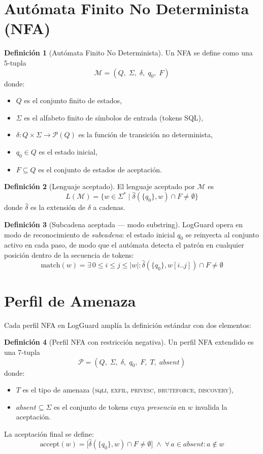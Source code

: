 \documentclass[12pt, a4paper]{report}
\theoremstyle{definition}
\newtheorem{definicion}{Definición}[chapter]
\theoremstyle{remark}
\newcommand{\nfa}[1]{\ensuremath{\mathcal{#1}}}
\begin{document}
\section{Autómata Finito No Determinista (NFA)}

\begin{definicion}[Autómata Finito No Determinista]
Un NFA se define como una 5-tupla
\[
  \nfa{M} = (Q,\; \Sigma,\; \delta,\; q_0,\; F)
\]
donde:
\begin{itemize}
  \item $Q$ es el conjunto finito de estados,
  \item $\Sigma$ es el alfabeto finito de símbolos de entrada (tokens SQL),
  \item $\delta : Q \times \Sigma \to \mathcal{P}(Q)$ es la función de
        transición no determinista,
  \item $q_0 \in Q$ es el estado inicial,
  \item $F \subseteq Q$ es el conjunto de estados de aceptación.
\end{itemize}
\end{definicion}

\begin{definicion}[Lenguaje aceptado]
El lenguaje aceptado por $\nfa{M}$ es
\[
  L(\nfa{M}) = \{ w \in \Sigma^* \mid \hat\delta(\{q_0\}, w) \cap F \neq \emptyset \}
\]
donde $\hat\delta$ es la extensión de $\delta$ a cadenas.
\end{definicion}

\begin{definicion}[Subcadena aceptada — modo substring]
LogGuard opera en modo de reconocimiento de \emph{subcadena}: el estado inicial
$q_0$ se reinyecta al conjunto activo en cada paso, de modo que el autómata
detecta el patrón en cualquier posición dentro de la secuencia de tokens:
\[
  \text{match}(w) = \exists\, 0 \le i \le j \le |w| : \hat\delta(\{q_0\}, w[i..j]) \cap F \neq \emptyset
\]
\end{definicion}

\section{Perfil de Amenaza}

Cada perfil NFA en LogGuard amplía la definición estándar con dos elementos:

\begin{definicion}[Perfil NFA con restricción negativa]
Un perfil NFA extendido es una 7-tupla
\[
  \nfa{P} = (Q,\; \Sigma,\; \delta,\; q_0,\; F,\; T,\; \mathit{absent})
\]
donde:
\begin{itemize}
  \item $T$ es el tipo de amenaza (\textsc{sqli}, \textsc{exfil},
        \textsc{privesc}, \textsc{bruteforce}, \textsc{discovery}),
  \item $\mathit{absent} \subseteq \Sigma$ es el conjunto de tokens cuya
        \emph{presencia} en $w$ invalida la aceptación.
\end{itemize}
La aceptación final se define:
\[
  \text{accept}(w) = \bigl[\hat\delta(\{q_0\},w) \cap F \neq \emptyset\bigr]
                   \;\wedge\; \forall\, a \in \mathit{absent} : a \notin w
\]
\end{definicion}
\end{document}
